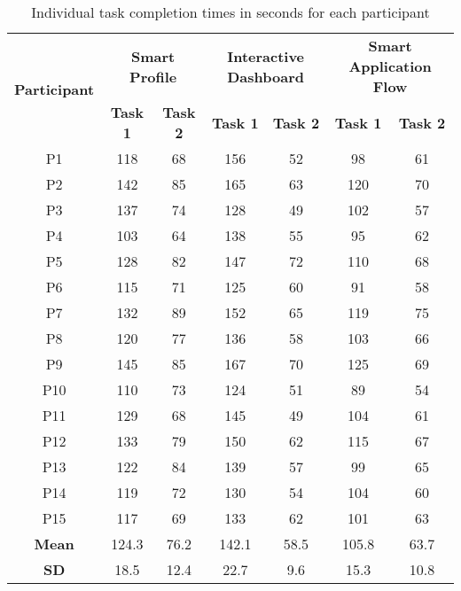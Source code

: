 \documentclass[
	letterpaper, %
]{jdf}
\begin{document}
\begin{sloppypar}
\begin{table}[h]
\centering
\begin{tabular}{|c|c|c|c|c|c|c|}
\hline
\multirow{2}{*}{\textbf{Participant}} & \multicolumn{2}{c|}{\textbf{Smart Profile}} & \multicolumn{2}{c|}{\textbf{Interactive Dashboard}} & \multicolumn{2}{c|}{\textbf{Smart Application Flow}} \\
\cline{2-7}
 & \textbf{Task 1} & \textbf{Task 2} & \textbf{Task 1} & \textbf{Task 2} & \textbf{Task 1} & \textbf{Task 2} \\
\hline
P1 & 118 & 68 & 156 & 52 & 98 & 61 \\
\hline
P2 & 142 & 85 & 165 & 63 & 120 & 70 \\
\hline
P3 & 137 & 74 & 128 & 49 & 102 & 57 \\
\hline
P4 & 103 & 64 & 138 & 55 & 95 & 62 \\
\hline
P5 & 128 & 82 & 147 & 72 & 110 & 68 \\
\hline
P6 & 115 & 71 & 125 & 60 & 91 & 58 \\
\hline
P7 & 132 & 89 & 152 & 65 & 119 & 75 \\
\hline
P8 & 120 & 77 & 136 & 58 & 103 & 66 \\
\hline
P9 & 145 & 85 & 167 & 70 & 125 & 69 \\
\hline
P10 & 110 & 73 & 124 & 51 & 89 & 54 \\
\hline
P11 & 129 & 68 & 145 & 49 & 104 & 61 \\
\hline
P12 & 133 & 79 & 150 & 62 & 115 & 67 \\
\hline
P13 & 122 & 84 & 139 & 57 & 99 & 65 \\
\hline
P14 & 119 & 72 & 130 & 54 & 104 & 60 \\
\hline
P15 & 117 & 69 & 133 & 62 & 101 & 63 \\
\hline
\textbf{Mean} & 124.3 & 76.2 & 142.1 & 58.5 & 105.8 & 63.7 \\
\hline
\textbf{SD} & 18.5 & 12.4 & 22.7 & 9.6 & 15.3 & 10.8 \\
\hline
\end{tabular}
\caption{Individual task completion times in seconds for each participant}
\end{table}


\end{sloppypar}
\end{document}
